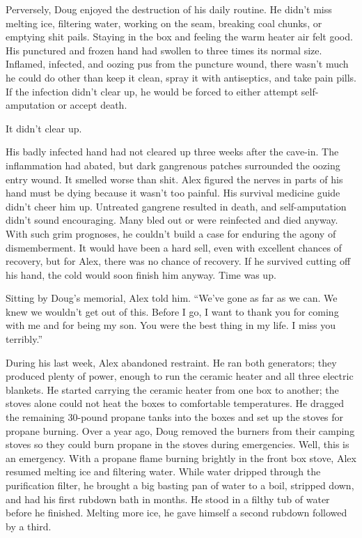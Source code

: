 Perversely, Doug enjoyed the destruction of his daily routine. He didn't
miss melting ice, filtering water, working on the seam, breaking coal
chunks, or emptying shit pails. Staying in the box and feeling the warm
heater air felt good. His punctured and frozen hand had swollen to three
times its normal size. Inflamed, infected, and oozing pus from the
puncture wound, there wasn't much he could do other than keep it clean,
spray it with antiseptics, and take pain pills. If the infection didn't
clear up, he would be forced to either attempt self-amputation or accept
death.

It didn't clear up.

His badly infected hand had not cleared up three weeks after the
cave-in. The inflammation had abated, but dark gangrenous patches
surrounded the oozing entry wound. It smelled worse than shit. Alex
figured the nerves in parts of his hand must be dying because it wasn't
too painful. His survival medicine guide didn't cheer him up. Untreated
gangrene resulted in death, and self-amputation didn't sound
encouraging. Many bled out or were reinfected and died anyway. With such
grim prognoses, he couldn't build a case for enduring the agony of
dismemberment. It would have been a hard sell, even with excellent
chances of recovery, but for Alex, there was no chance of recovery. If
he survived cutting off his hand, the cold would soon finish him anyway.
Time was up.

Sitting by Doug's memorial, Alex told him. ``We've gone as far as we
can. We knew we wouldn't get out of this. Before I go, I want to thank
you for coming with me and for being my son. You were the best thing in
my life. I miss you terribly.''

During his last week, Alex abandoned restraint. He ran both generators;
they produced plenty of power, enough to run the ceramic heater and all
three electric blankets. He started carrying the ceramic heater from one
box to another; the stoves alone could not heat the boxes to comfortable
temperatures. He dragged the remaining 30-pound propane tanks into the
boxes and set up the stoves for propane burning. Over a year ago, Doug
removed the burners from their camping stoves so they could burn propane
in the stoves during emergencies. Well, this is an emergency. With a
propane flame burning brightly in the front box stove, Alex resumed
melting ice and filtering water. While water dripped through the
purification filter, he brought a big basting pan of water to a boil,
stripped down, and had his first rubdown bath in months. He stood in a
filthy tub of water before he finished. Melting more ice, he gave
himself a second rubdown followed by a third.


